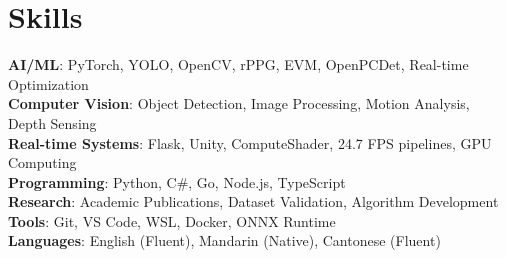 \documentclass[letterpaper,11pt]{article}
\begin{document}
\section{Skills}
 \begin{itemize}[leftmargin=0.15in, label={}]
    \small{\item{
     \textbf{AI/ML}{: PyTorch, YOLO, OpenCV, rPPG, EVM, OpenPCDet, Real-time Optimization} \\
     \textbf{Computer Vision}{: Object Detection, Image Processing, Motion Analysis, Depth Sensing} \\
     \textbf{Real-time Systems}{: Flask, Unity, ComputeShader, 24.7 FPS pipelines, GPU Computing} \\
     \textbf{Programming}{: Python, C\#, Go, Node.js, TypeScript} \\
     \textbf{Research}{: Academic Publications, Dataset Validation, Algorithm Development} \\
     \textbf{Tools}{: Git, VS Code, WSL, Docker, ONNX Runtime} \\
     \textbf{Languages}{: English (Fluent), Mandarin (Native), Cantonese (Fluent)}
    }}
 \end{itemize}

\end{document}
